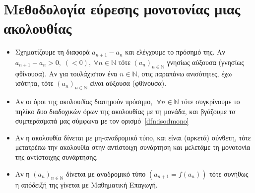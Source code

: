 \documentclass[main.tex]{subfiles}
\begin{document}
\section{Μεθοδολογία εύρεσης μονοτονίας μιας ακολουθίας}
\begin{itemize}
    \item Σχηματίζουμε τη διαφορά $ a_{n+1} - a_n $ και ελέγχουμε το 
        πρόσημό της. Αν $ a_{n+1}-a_{n}>0, \; (<0), \; \forall n \in 
        \mathbb{N} $ τότε $ (a_{n})_{n \in \mathbb{N}}$ γνησίως 
        αύξουσα (γνησίως φθίνουσα). Αν για τουλάχιστον ένα 
        $ n \in \mathbb{N} $, στις παραπάνω ανισότητες, έχω ισότητα, 
        τότε  $ (a_{n})_{n \in \mathbb{N}} $ είναι αύξουσα (φθίνουσα).
    \item Αν οι όροι της ακολουϑίας διατηρούν πρόσημο, $ \; \forall n \in
        \mathbb{N} $ τότε συγκρίνουμε το πηλίκο δυο διαδοχικών όρων της 
        ακολουθίας με τη μονάδα, και βγάζουμε τα συμπεράσματά μας 
        σύμφωνα με τον ορισμό~\ref{dfn:isodmono}
    \item Αν η ακολουθία δίνεται με μη-αναδρομικό τύπο, και είναι 
        (αρκετά) σύνθετη, τότε μετατρέπω την ακολουθία στην αντίστοιχη 
        συνάρτηση και μελετάμε τη μονοτονία της αντίστοιχης συνάρτησης.
    \item Αν η $ (a_{n})_{n \in \mathbb{N}} $ δίνεται με αναδρομικό 
        τύπο $ (a_{n+1}= f(a_{n})) $ τότε συνήθως η απόδειξή της γίνεται 
        με Μαθηματική Επαγωγή.
\end{itemize}
\end{document}
